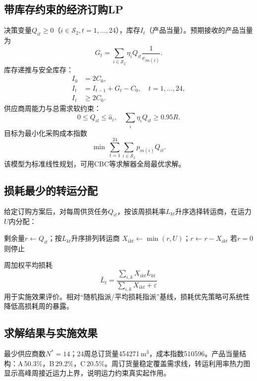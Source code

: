 \documentclass[12pt,a4paper]{ctexart}
\begin{document}
\subsection{带库存约束的经济订购LP}
决策变量$Q_{it}\ge0$（$i\in\mathcal{S}_2,t=1,\ldots,24$），库存$I_t$（产品当量）。预期接收的产品当量为
\begin{equation}
G_t=\sum_{i\in\mathcal{S}_2}\eta_i Q_{it}\frac{1}{e_{m(i)}}.
\end{equation}
库存递推与安全库存：
\begin{align}
I_0&=2C_0,\\
I_t&=I_{t-1}+G_t-C_0,\quad t=1,\ldots,24,\\
I_t&\ge 2C_0.
\end{align}
供应商周能力与总需求软约束：
\begin{equation}
0\le Q_{it}\le\hat{a}_i,\quad
\sum_i\eta_i Q_{it}\ge 0.95R.
\end{equation}
目标为最小化采购成本指数
\begin{equation}
\label{eq:q2obj}
\min\ \sum_{t=1}^{24}\sum_{i\in\mathcal{S}_2} p_{m(i)} Q_{it}.
\end{equation}
该模型为标准线性规划，可用CBC等求解器全局最优求解。

\subsection{损耗最少的转运分配}
给定订购方案后，对每周供货任务$Q_{it}$，按该周损耗率$L_{kt}$升序选择转运商，在运力$U$内分配：
\begin{algorithm}[H]
\caption{损耗优先的转运贪心分配}
\begin{algorithmic}[1]
\STATE 剩余量$r\leftarrow Q_{it}$；按$L_{kt}$升序排列转运商
\STATE $X_{ikt}\leftarrow\min(r,U)$；$r\leftarrow r-X_{ikt}$
\STATE 若$r=0$则停止
\ENDFOR
\ENDFOR
\end{algorithmic}
\end{algorithm}
周加权平均损耗
\begin{equation}
\bar{L}_t=\frac{\sum_{i,k} X_{ikt} L_{kt}}{\sum_{i,k} X_{ikt}+\varepsilon}
\end{equation}
用于实施效果评价。相对“随机指派/平均损耗指派”基线，损耗优先策略可系统性降低高损耗周的暴露。

\subsection{求解结果与实施效果}
最少供应商数$N^*=14$；24周总订货量454271\,m$^3$，成本指数510596。产品当量结构：A\,50.3\%，B\,29.2\%，C\,20.5\%。周订货量稳定覆盖需求线，转运利用率热力图显示高峰周接近运力上界，说明运力约束真实起作用。
\end{document}
